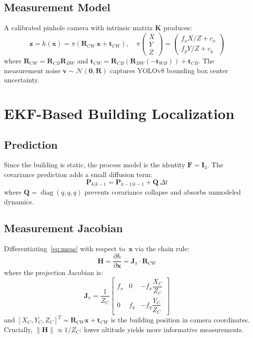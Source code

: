 \documentclass[journal]{IEEEtran}
\newcommand{\vx}{\mathbf{x}}
\newcommand{\vz}{\mathbf{z}}
\newcommand{\vP}{\mathbf{P}}
\newcommand{\vQ}{\mathbf{Q}}
\newcommand{\vR}{\mathbf{R}}
\newcommand{\vH}{\mathbf{H}}
\newcommand{\vK}{\mathbf{K}}
\newcommand{\vI}{\mathbf{I}}
\newcommand{\vF}{\mathbf{F}}
\begin{document}
\subsection{Measurement Model}
A calibrated pinhole camera with intrinsic matrix $\vK$ produces:
\begin{equation}\label{eq:meas}
    \vz = h(\vx) = \pi\!\left(\vR_{CW}\,\vx + \mathbf{t}_{CW}\right), \quad
    \pi\!\begin{pmatrix}X\\Y\\Z\end{pmatrix} = \begin{pmatrix}f_x X/Z + c_x \\ f_y Y/Z + c_y\end{pmatrix}
\end{equation}
where $\vR_{CW} = \vR_{CB}\vR_{BW}$ and $\mathbf{t}_{CW} = \vR_{CB}(\vR_{BW}(-\mathbf{t}_{WB})) + \mathbf{t}_{CB}$.
The measurement noise $\mathbf{v} \sim \mathcal{N}(\mathbf{0}, \vR)$ captures YOLOv8 bounding box center uncertainty.

\section{EKF-Based Building Localization}

\subsection{Prediction}
Since the building is static, the process model is the identity $\vF = \vI_3$.
The covariance prediction adds a small diffusion term:
\begin{equation}
    \vP_{k|k-1} = \vP_{k-1|k-1} + \vQ\,\Delta t
\end{equation}
where $\vQ = \operatorname{diag}(q, q, q)$ prevents covariance collapse and absorbs unmodeled dynamics.

\subsection{Measurement Jacobian}
Differentiating~\eqref{eq:meas} with respect to~$\vx$ via the chain rule:
\begin{equation}\label{eq:jacobian}
    \vH = \frac{\partial h}{\partial \vx} = \mathbf{J}_\pi \cdot \vR_{CW}
\end{equation}
where the projection Jacobian is:
\begin{equation}
    \mathbf{J}_\pi = \frac{1}{Z_C}\begin{bmatrix}
        f_x & 0 & -f_x\dfrac{X_C}{Z_C} \\[4pt]
        0 & f_y & -f_y\dfrac{Y_C}{Z_C}
    \end{bmatrix}
\end{equation}
and $[X_C, Y_C, Z_C]^T = \vR_{CW}\vx + \mathbf{t}_{CW}$ is the building position in camera coordinates.
Crucially, $\|\vH\| \propto 1/Z_C$: lower altitude yields more informative measurements.
\end{document}
